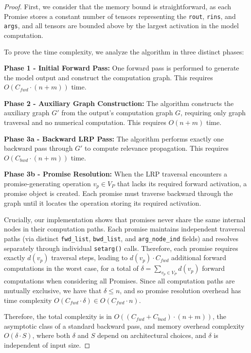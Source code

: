 \documentclass{article}
\begin{document}
\begin{proof}
First, we consider that the memory bound is straightforward, as each Promise stores a constant number of tensors representing the \texttt{rout}, \texttt{rins}, and \texttt{args}, and all tensors are bounded above by the largest activation in the model computation.

To prove the time complexity, we analyze the algorithm in three distinct phases:

\textbf{Phase 1 - Initial Forward Pass:} One forward pass is performed to generate the model output and construct the computation graph. This requires $O(C_{fwd} \cdot (n + m))$ time.

\textbf{Phase 2 - Auxiliary Graph Construction:} The algorithm constructs the auxiliary graph $G'$ from the output's computation graph $G$, requiring only graph traversal and no numerical computation. This requires $O(n + m)$ time.

\textbf{Phase 3a - Backward LRP Pass:} The algorithm performs exactly one backward pass through $G'$ to compute relevance propagation. This requires $O(C_{bwd} \cdot (n + m))$ time.

\textbf{Phase 3b - Promise Resolution:} When the LRP traversal encounters a promise-generating operation $v_p \in V_P$ that lacks its required forward activation, a promise object is created. Each promise must traverse backward through the graph until it locates the operation storing its required activation. 

Crucially, our implementation shows that promises never share the same internal nodes in their computation paths. Each promise maintains independent traversal paths (via distinct \texttt{fwd\_list}, \texttt{bwd\_list}, and \texttt{arg\_node\_ind} fields) and resolves separately through individual \texttt{setarg()} calls.
Therefore, each promise requires exactly $d(v_p)$ traversal steps, leading to $d(v_p) \cdot C_{fwd}$ additional forward computations in the worst case, for a total of $\delta = \sum_{v_p \in V_P} d(v_p)$ forward computations when considering all Promises.
Since all computation paths are mutually exclusive, we have that $\delta \leq n$, and so promise resolution overhead has time complexity $O(C_{fwd} \cdot \delta) \in O(C_{fwd} \cdot n)$.

Therefore, the total complexity is in $O((C_{fwd} + C_{bwd}) \cdot (n + m))$, the asymptotic class of a standard backward pass, and memory overhead complexity $O(\delta \cdot S)$, where both $\delta$ and $S$ depend on architectural choices, and $\delta$ is independent of input size.
\end{proof}
\end{document}
